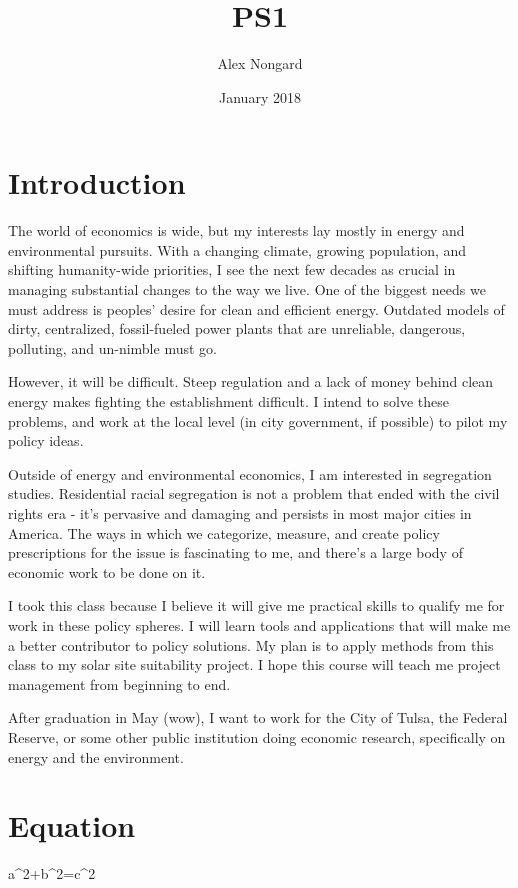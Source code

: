 \documentclass{article}
\title{PS1}
\author{Alex Nongard}
\date{January 2018}
\begin{document}
\maketitle

\section{Introduction}

The world of economics is wide, but my interests lay mostly in energy and environmental pursuits. With a changing climate, growing population, and shifting humanity-wide priorities, I see the next few decades as crucial in managing substantial changes to the way we live. One of the biggest needs we must address is peoples' desire for clean and efficient energy. Outdated models of dirty, centralized, fossil-fueled power plants that are unreliable, dangerous, polluting, and un-nimble must go.

However, it will be difficult. Steep regulation and a lack of money behind clean energy makes fighting the establishment difficult. I intend to solve these problems, and work at the local level (in city government, if possible) to pilot my policy ideas. 

Outside of energy and environmental economics, I am interested in segregation studies. Residential racial segregation is not a problem that ended with the civil rights era - it's pervasive and damaging and persists in most major cities in America. The ways in which we categorize, measure, and create policy prescriptions for the issue is fascinating to me, and there's a large body of economic work to be done on it. 

I took this class because I believe it will give me practical skills to qualify me for work in these policy spheres. I will learn tools and applications that will make me a better contributor to policy solutions. My plan is to apply methods from this class to my solar site suitability project. I hope this course will teach me project management from beginning to end. 

After graduation in May (wow), I want to work for the City of Tulsa, the Federal Reserve, or some other public institution doing economic research, specifically on energy and the environment. 

\section{Equation}
a^2+b^2=c^2
\end{document}
